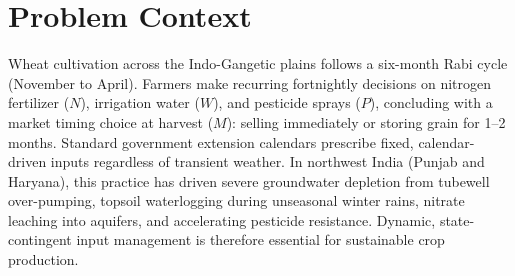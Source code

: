 \documentclass[10pt,twocolumn]{article}
\newlength{\croptitlewidth}
\begin{document}
\fontsize{9.3pt}{11.3pt}\selectfont


\section{Problem Context}
Wheat cultivation across the Indo-Gangetic plains follows a six-month Rabi cycle (November to April). Farmers make recurring fortnightly decisions on nitrogen fertilizer ($N$), irrigation water ($W$), and pesticide sprays ($P$), concluding with a market timing choice at harvest ($M$): selling immediately or storing grain for 1--2 months. Standard government extension calendars prescribe fixed, calendar-driven inputs regardless of transient weather. In northwest India (Punjab and Haryana), this practice has driven severe groundwater depletion from tubewell over-pumping, topsoil waterlogging during unseasonal winter rains, nitrate leaching into aquifers, and accelerating pesticide resistance. Dynamic, state-contingent input management is therefore essential for sustainable crop production.
\end{document}

